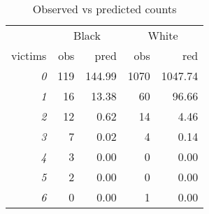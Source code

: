 \begin{table}[H]

\caption{\label{tab:obs_vs_pred}Observed vs predicted counts}
\centering
\begin{tabular}[t]{>{}r|r|r|r|r}
\hline
\multicolumn{1}{c|}{ } & \multicolumn{2}{c|}{Black} & \multicolumn{2}{c}{White} \\
\cline{2-3} \cline{4-5}
victims & obs & pred & obs & red\\
\hline
\hline
\em{0} & 119 & 144.99 & 1070 & 1047.74\\
\hline
\em{1} & 16 & 13.38 & 60 & 96.66\\
\hline
\em{2} & 12 & 0.62 & 14 & 4.46\\
\hline
\em{3} & 7 & 0.02 & 4 & 0.14\\
\hline
\em{4} & 3 & 0.00 & 0 & 0.00\\
\hline
\em{5} & 2 & 0.00 & 0 & 0.00\\
\hline
\em{6} & 0 & 0.00 & 1 & 0.00\\
\hline
\end{tabular}
\end{table}